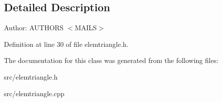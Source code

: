 \subsection{Detailed Description}
\begin{Desc}
\item[Author:]AUTHORS $<$MAILS$>$ \end{Desc}


Definition at line 30 of file elemtriangle.h.

The documentation for this class was generated from the following files:\begin{CompactItemize}
\item 
src/elemtriangle.h\item 
src/elemtriangle.cpp\end{CompactItemize}
